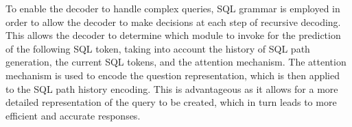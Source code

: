 To enable the decoder to handle complex queries, SQL grammar is employed in order to allow the decoder to make decisions at each step of recursive decoding. This allows the decoder to determine which module to invoke for the prediction of the following SQL token, taking into account the history of SQL path generation, the current SQL tokens, and the attention mechanism. The attention mechanism is used to encode the question representation, which is then applied to the SQL path history encoding. This is advantageous as it allows for a more detailed representation of the query to be created, which in turn leads to more efficient and accurate responses.


